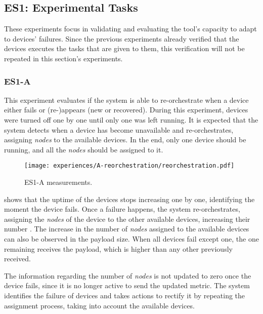 
\subsection{ES1: Experimental Tasks}\label{sec:discussion_scenario1_exp}

These experiments focus in validating and evaluating the tool's capacity to adapt to devices' failures. Since the previous experiments  already verified that the devices executes the tasks that are given to them, this verification will not be repeated in this section's experiments.


\subsubsection{ES1-A}\label{sec:exp_a}

This experiment evaluates if the system is able to re-orchestrate when a device either fails or (re-)appears (\ie new or recovered). During this experiment, devices were turned off one by one until only one was left running. It is expected that the system detects when a device has become unavailable and re-orchestrates, assigning \textit{nodes} to the available devices. In the end, only one device should be running, and all the \textit{nodes} should be assigned to it.

\begin{figure}[h]
\centering
\texttt{[image: experiences/A-reorchestration/reorchestration.pdf]}
\caption[ES1-A measurements]{ES1-A measurements.}\label{fig:experiment_a_graph}
\end{figure}

 shows that the uptime of the devices stops increasing one by one, identifying the moment the device fails. Once a failure happens, the system re-orchestrates, assigning the \textit{nodes} of the device to the other available devices, increasing their number . The increase in the number of \textit{nodes} assigned to the available devices can also be observed in the payload size. When all devices fail except one, the one remaining receives the payload, which is higher than any other previously received.

The information regarding the number of \textit{nodes} is not updated to zero once the device fails, since it is no longer active to send the updated metric. The system identifies the failure of devices and takes actions to rectify it by repeating the assignment process, taking into account the available devices.

